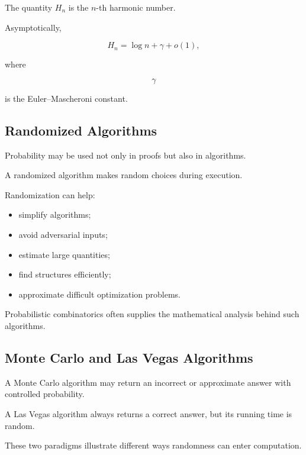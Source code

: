 The quantity \(H_n\) is the \(n\)-th harmonic number.

Asymptotically,

\[
\boxed{
H_n
=
\log n+\gamma+o(1),
}
\]

where

\[
\gamma
\]

is the Euler--Mascheroni constant.

\subsection{Randomized Algorithms}
\label{subsec:randomized-algorithms-preview}

Probability may be used not only in proofs but also in algorithms.

A randomized algorithm makes random choices during execution.

Randomization can help:

\begin{itemize}
    \item simplify algorithms;
    \item avoid adversarial inputs;
    \item estimate large quantities;
    \item find structures efficiently;
    \item approximate difficult optimization problems.
\end{itemize}

Probabilistic combinatorics often supplies the mathematical analysis
behind such algorithms.

\subsection{Monte Carlo and Las Vegas Algorithms}
\label{subsec:monte-carlo-las-vegas}

A Monte Carlo algorithm may return an incorrect or approximate answer
with controlled probability.

A Las Vegas algorithm always returns a correct answer, but its running
time is random.

These two paradigms illustrate different ways randomness can enter
computation.


